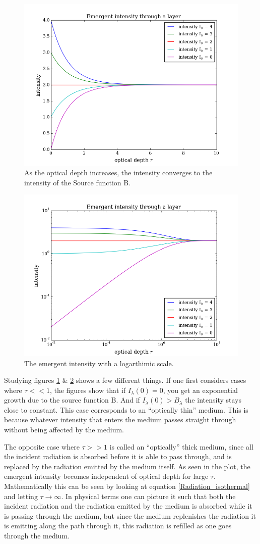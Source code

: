 \documentclass{aa}   %
\begin{document}
\begin{figure}
\includegraphics[width=.49\textwidth]{emergent_original.png}
\caption{As the optical depth increases, the intensity converges to the intensity of the Source function B.}
\label{emergent_original}
\end{figure}

\begin{figure}
 \includegraphics[width=.49\textwidth]{emergent_log.png}
 \caption{The emergent intensity with a logarthimic scale.}
 \label{emergent_log}
\end{figure}
Studying figures \ref{emergent_original} \& \ref{emergent_log} shows a few different things.
If one first considers cases where $\tau << 1$, the figures show that if $I_\lambda(0) = 0$, you get an exponential growth due to the source function B. And if $I_\lambda(0) > B_\lambda$ the intensity stays close to constant. This case corresponds to an ``optically thin'' medium. This is because whatever intensity that enters the medium passes straight through without being affected by the medium.

The opposite case where $\tau >> 1$ is called an ``optically'' thick medium, since all the incident radiation is absorbed before it is able to pass through, and is replaced by the radiation emitted by the medium itself. As seen in the plot, the emergent intensity becomes independent of optical depth for large $\tau$. Mathematically this can be seen by looking at equation \ref{Radiation_isothermal} and letting $\tau \rightarrow \infty$. In physical terms one can picture it such that both the incident radiation and the radiation emitted by the medium is absorbed while it is passing through the medium, but since the medium replenishes the radiation it is emitting along the path through it, this radiation is refilled as one goes through the medium.
\end{document}
